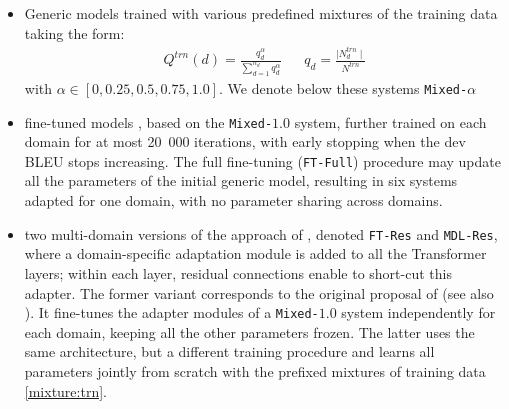 \documentclass[11pt,a4paper]{article}
\newcommand{\revision}[1]{#1}
\newcommand{\system}[1]{\texttt{{#1}}}
\begin{document}
\begin{itemize}
\itemsep0em 
\item Generic models trained with various predefined mixtures of the training data taking the form:
\begin{align} \label{mixture:trn}
Q^{trn}(d) = \frac{q_d^{\alpha}}{\displaystyle{\mathop{\sum}_{d=1}^{n_d}q_d^{\alpha}}} &&
q_d = \frac{\mid N^{trn}_d \mid}{\displaystyle{N^{trn}}} %
\end{align} 
with $\alpha \in [0,0.25,0.5,0.75,1.0]$. We denote below these systems \system{Mixed-$\alpha$}
\item fine-tuned models \cite{Luong15stanford,Freitag16fast}, based on the \system{Mixed-$1.0$} system, further trained on each domain for at most 20~000 iterations, with early stopping when the dev BLEU stops increasing. The full fine-tuning (\system{FT-Full}) procedure may update all the parameters of the initial generic model, resulting in six systems adapted for one domain, with no parameter sharing across domains.

\item two multi-domain versions of the approach of , denoted \system{FT-Res} and \system{MDL-Res}, where a domain-specific adaptation module is added to all the Transformer layers; within each layer, residual connections enable to short-cut this adapter. The former variant corresponds to the original proposal of \citet{Bapna19simple} (see also \cite{Sharaf20metalearning}). It fine-tunes the adapter modules of a \system{Mixed-$1.0$} system independently for each domain, keeping all the other parameters frozen. The latter uses the same architecture, but a different training procedure and learns all parameters jointly from scratch with the prefixed mixtures of training data \ref{mixture:trn}.
\end{itemize}
\end{document}
